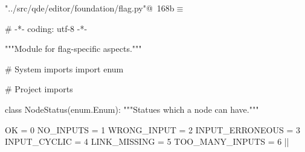 \documentclass[%
    a4paper,    %
    justified,  %
    nobib,      %
    openany     %
]{tufte-book}
\begin{document}
\begin{flushleft} \small
\begin{minipage}{\linewidth}\label{scrap190}\raggedright\small
{} \verb@"../src/qde/editor/foundation/flag.py"@\nobreak\ {\footnotesize {168b}}$\equiv$
\vspace{-1ex}
\begin{pythoncode}
# -*- coding: utf-8 -*-

"""Module for flag-specific aspects."""

# System imports
import enum

# Project imports


class NodeStatus(enum.Enum):
    """Statues which a node can have."""

    OK              = 0
    NO_INPUTS       = 1
    WRONG_INPUT     = 2
    INPUT_ERRONEOUS = 3
    INPUT_CYCLIC    = 4
    LINK_MISSING    = 5
    TOO_MANY_INPUTS = 6
|\NWsep|
\end{pythoncode}
\vspace{1.5ex}
\footnotesize
\begin{list}{}{\setlength{\itemsep}{-\parsep}\setlength{\itemindent}{-\leftmargin}}

\item{}
\end{list}
\end{minipage}\vspace{4ex}
\end{flushleft}
\end{document}
